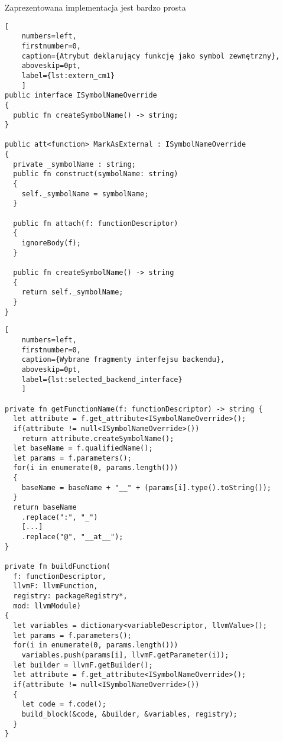 Zaprezentowana implementacja jest bardzo prosta 

\begin{minipage}{\linewidth}
  
  \begin{lstlisting}[
    numbers=left,
    firstnumber=0,
    caption={Atrybut deklarujący funkcję jako symbol zewnętrzny},
    aboveskip=0pt,
    label={lst:extern_cm1}
    ]
public interface ISymbolNameOverride
{
  public fn createSymbolName() -> string;
}

public att<function> MarkAsExternal : ISymbolNameOverride
{
  private _symbolName : string;
  public fn construct(symbolName: string)
  {
    self._symbolName = symbolName;
  }

  public fn attach(f: functionDescriptor)
  {
    ignoreBody(f);
  }

  public fn createSymbolName() -> string
  {
    return self._symbolName;
  }
}
\end{lstlisting}
\end{minipage}

\begin{minipage}{\linewidth}
  
  \begin{lstlisting}[
    numbers=left,
    firstnumber=0,
    caption={Wybrane fragmenty interfejsu backendu},
    aboveskip=0pt,
    label={lst:selected_backend_interface}
    ]

private fn getFunctionName(f: functionDescriptor) -> string {
  let attribute = f.get_attribute<ISymbolNameOverride>();
  if(attribute != null<ISymbolNameOverride>())
    return attribute.createSymbolName();
  let baseName = f.qualifiedName();
  let params = f.parameters();
  for(i in enumerate(0, params.length()))
  {
    baseName = baseName + "__" + (params[i].type().toString());
  }
  return baseName
    .replace(":", "_")
    [...]
    .replace("@", "__at__");
}

private fn buildFunction(
  f: functionDescriptor,
  llvmF: llvmFunction,
  registry: packageRegistry*,
  mod: llvmModule)
{
  let variables = dictionary<variableDescriptor, llvmValue>();
  let params = f.parameters();
  for(i in enumerate(0, params.length()))
    variables.push(params[i], llvmF.getParameter(i));
  let builder = llvmF.getBuilder();
  let attribute = f.get_attribute<ISymbolNameOverride>();
  if(attribute != null<ISymbolNameOverride>())
  {
    let code = f.code();
    build_block(&code, &builder, &variables, registry);
  }
}

\end{lstlisting}
\end{minipage}

